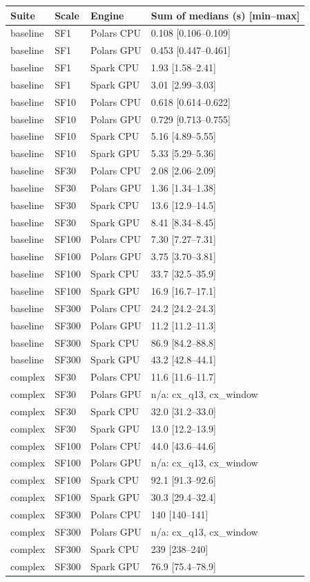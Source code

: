 \begin{tabular}{llll}
\toprule
Suite & Scale & Engine & Sum of medians (s) [min--max] \\
\midrule
baseline & SF1 & Polars CPU & 0.108 [0.106--0.109] \\
baseline & SF1 & Polars GPU & 0.453 [0.447--0.461] \\
baseline & SF1 & Spark CPU & 1.93 [1.58--2.41] \\
baseline & SF1 & Spark GPU & 3.01 [2.99--3.03] \\
baseline & SF10 & Polars CPU & 0.618 [0.614--0.622] \\
baseline & SF10 & Polars GPU & 0.729 [0.713--0.755] \\
baseline & SF10 & Spark CPU & 5.16 [4.89--5.55] \\
baseline & SF10 & Spark GPU & 5.33 [5.29--5.36] \\
baseline & SF30 & Polars CPU & 2.08 [2.06--2.09] \\
baseline & SF30 & Polars GPU & 1.36 [1.34--1.38] \\
baseline & SF30 & Spark CPU & 13.6 [12.9--14.5] \\
baseline & SF30 & Spark GPU & 8.41 [8.34--8.45] \\
baseline & SF100 & Polars CPU & 7.30 [7.27--7.31] \\
baseline & SF100 & Polars GPU & 3.75 [3.70--3.81] \\
baseline & SF100 & Spark CPU & 33.7 [32.5--35.9] \\
baseline & SF100 & Spark GPU & 16.9 [16.7--17.1] \\
baseline & SF300 & Polars CPU & 24.2 [24.2--24.3] \\
baseline & SF300 & Polars GPU & 11.2 [11.2--11.3] \\
baseline & SF300 & Spark CPU & 86.9 [84.2--88.8] \\
baseline & SF300 & Spark GPU & 43.2 [42.8--44.1] \\
complex & SF30 & Polars CPU & 11.6 [11.6--11.7] \\
complex & SF30 & Polars GPU & n/a: cx\_q13, cx\_window \\
complex & SF30 & Spark CPU & 32.0 [31.2--33.0] \\
complex & SF30 & Spark GPU & 13.0 [12.2--13.9] \\
complex & SF100 & Polars CPU & 44.0 [43.6--44.6] \\
complex & SF100 & Polars GPU & n/a: cx\_q13, cx\_window \\
complex & SF100 & Spark CPU & 92.1 [91.3--92.6] \\
complex & SF100 & Spark GPU & 30.3 [29.4--32.4] \\
complex & SF300 & Polars CPU & 140 [140--141] \\
complex & SF300 & Polars GPU & n/a: cx\_q13, cx\_window \\
complex & SF300 & Spark CPU & 239 [238--240] \\
complex & SF300 & Spark GPU & 76.9 [75.4--78.9] \\
\bottomrule
\end{tabular}
